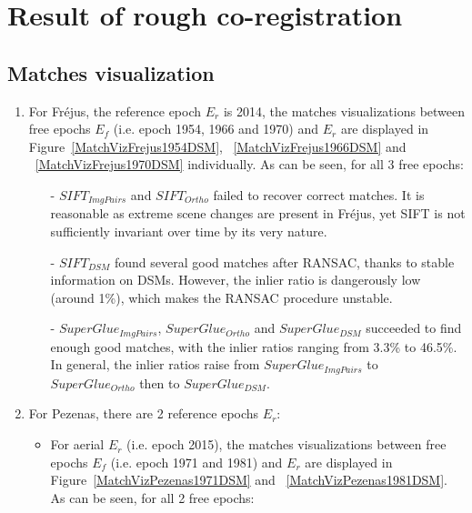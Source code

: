 
\chapter{Result of rough co-registration}
\label{chap:appendixA}

\section{Matches visualization}
\label{sec:matchViz}
\begin{enumerate}
	\item For Fr{\'e}jus, the reference epoch $E_r$ is 2014, the matches visualizations between free epochs $E_f$ (i.e. epoch 1954, 1966 and 1970) and $E_r$ are displayed in Figure~\ref{MatchVizFrejus1954DSM}, ~\ref{MatchVizFrejus1966DSM} and ~\ref{MatchVizFrejus1970DSM} individually. As can be seen, for all 3 free epochs:\\
	\begin{itemize}
		\item[-] $SIFT_{ImgPairs}$ and $SIFT_{Ortho}$ failed to recover correct matches. It is reasonable as extreme scene changes are present in Fr{\'e}jus, yet SIFT is not sufficiently invariant over time by its very nature.
		\item[-] $SIFT_{DSM}$ found several good matches after RANSAC, thanks to stable information on DSMs. However, the inlier ratio is dangerously low (around 1\%), which makes the RANSAC procedure unstable.
		\item[-] $SuperGlue_{ImgPairs}$, $SuperGlue_{Ortho}$ and $SuperGlue_{DSM}$ succeeded to find enough good matches, with the inlier ratios ranging from 3.3\% to 46.5\%. In general, the inlier ratios raise from $SuperGlue_{ImgPairs}$ to $SuperGlue_{Ortho}$ then to $SuperGlue_{DSM}$.
	\end{itemize}
	\item For Pezenas, there are 2 reference epochs $E_r$:\\
	\begin{itemize}
		\item For aerial $E_r$ (i.e. epoch 2015), the matches visualizations between free epochs $E_f$ (i.e. epoch 1971 and 1981) and $E_r$ are displayed in Figure~\ref{MatchVizPezenas1971DSM} and ~\ref{MatchVizPezenas1981DSM}. As can be seen, for all 2 free epochs:\\

\end{itemize}
\end{enumerate}
